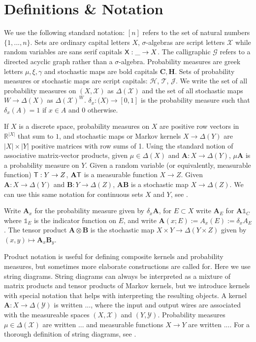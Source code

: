 
\section{Definitions \& Notation}\label{sec:dfin}

We use the following standard notation: $[n]$ refers to the set of natural numbers $\{1,...,n\}$. Sets are ordinary capital letters $X$, $\sigma$-algebras are script letters $\mathcal{X}$ while random variables are sans serif capitals $\mathsf{X}:\_\to X$. The calligraphic $\mathcal{G}$ refers to a directed acyclic graph rather than a $\sigma$-algebra. Probability measures are greek letters $\mu,\xi,\gamma$ and stochastic maps are bold capitals $\mathbf{C},\mathbf{H}$. Sets of probability measures or stochastic maps are script capitals: $\mathscr{H}$, $\mathscr{T}$, $\mathscr{J}$. We write the set of all probability measures on $(X,\mathcal{X})$ as $\Delta(\mathcal{X})$ and the set of all stochastic maps $W\to \Delta(X)$ as $\Delta(\mathcal{X})^W$. $\delta_x:\mathcal(X)\to [0,1]$ is the probability measure such that $\delta_x(A)=1$ if $x\in A$ and $0$ otherwise.

If $X$ is a discrete space, probability measures on $X$ are positive row vectors in $\mathbb{R}^{|X|}$ that sum to $1$, and stochastic maps or Markov kernels $X\to \Delta(Y)$ are $|X|\times |Y|$ positive matrices with row sums of 1. Using the standard notion of associative matrix-vector products, given $\mu\in \Delta(X)$ and $\mathbf{A}:X\to \Delta(Y)$, $\mu \mathbf{A}$ is a probability measure on $Y$. Given a random variable (or equivalently, measurable function) $\mathsf{T}:Y\to Z$, $\mathbf{A} \mathsf{T}$ is a measurable function $X\to Z$. Given $\mathbf{A}:X\to \Delta(Y)$ and $\mathbf{B}:Y\to \Delta(Z)$, $\mathbf{A}\mathbf{B}$ is a stochastic map $X\to \Delta(Z)$. We can use this same notation for continuous sets $X$ and $Y$, see \citet{cinlar_probability_2011}. 

Write $\mathbf{A}_x$ for the probability measure given by $\delta_x \mathbf{A}$, for $E\subset X$ write $\mathbf{A}_E$ for $\mathbf{A} \mathds{1}_C$ where $\mathds{1}_E$ is the indicator function on $E$, and write $\mathbf{A}(x;E):=A_x(E):=\delta_x A_E$. The tensor product $\mathbf{A}\otimes\mathbf{B}$ is the stochastic map $X\times Y\to \Delta(Y\times Z)$ given by $(x,y)\mapsto \mathbf{A}_x\mathbf{B}_y$.

Product notation is useful for defining composite kernels and probability measures, but sometimes more elaborate constructions are called for. Here we use string diagrams. String diagrams can always be interpreted as a mixture of matrix products and tensor products of Markov kernels, but we introduce kernels with special notation that helps with interpreting the resulting objects. A kernel $\mathbf{A}:X\to \Delta(\mathcal{Y})$ is written $...$, where the input and output wires are associated with the measureable spaces $(X,\mathcal{X})$ and $(Y,\mathcal{Y})$. Probability measures $\mu\in \Delta(\mathcal{X})$ are written $...$ and measurable functions $X\to Y$ are written $...$. For a thorough definition of string diagrams, see \citet{cho_disintegration_2019}.

